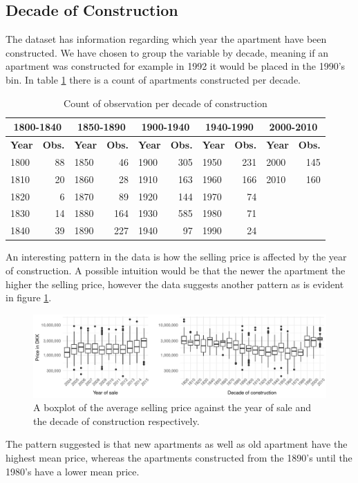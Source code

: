 \subsection*{Decade of Construction}
The dataset has information regarding which year the apartment have been constructed.
We have chosen to group the variable by decade, meaning if an apartment was constructed for example in 1992 it would be placed in the 1990's bin.
In table \ref{tbl:year_of_constuction} there is a count of apartments constructed per decade.
\begin{table}[H]
    \centering
    \begin{tabular}{lr|lr|lr|lr|lr}
        \toprule [1.5pt]
        \multicolumn{2}{c}{\textbf{1800-1840}} & 
        \multicolumn{2}{c}{\textbf{1850-1890}} & 
        \multicolumn{2}{c}{\textbf{1900-1940}} & 
        \multicolumn{2}{c}{\textbf{1940-1990}} & 
        \multicolumn{2}{c}{\textbf{2000-2010}} \\[2pt]
        \toprule[1.5pt]
        \textbf{Year} & \textbf{Obs.} & 
        \textbf{Year} & \textbf{Obs.} & 
        \textbf{Year} & \textbf{Obs.} & 
        \textbf{Year} & \textbf{Obs.} & 
        \textbf{Year} & \textbf{Obs.} \\
        \midrule
        1800 & 88 & 1850 & 46  & 1900 & 305 & 1950 & 231 & 2000 & 145 \\
        1810 & 20 & 1860 & 28  & 1910 & 163 & 1960 & 166 & 2010 & 160 \\
        1820 & 6  & 1870 & 89  & 1920 & 144 & 1970 & 74  \\
        1830 & 14 & 1880 & 164 & 1930 & 585 & 1980 & 71  \\
        1840 & 39 & 1890 & 227 & 1940 & 97  & 1990 & 24  \\
        \bottomrule
    \end{tabular}
    \caption{Count of observation per decade of construction}
    \label{tbl:year_of_constuction}
\end{table}
An interesting pattern in the data is how the selling price is affected by the year of construction.
A possible intuition would be that the newer the apartment the higher the selling price, however the data suggests another pattern as is evident in figure \ref{fig:house_price_year}.

\begin{figure}[H]
    \centering
    \includegraphics[width = \textwidth]{figures/Data_introduction/house_price_year.pdf}
    \caption{A boxplot of the average selling price against the year of sale and the decade of construction respectively.}
    \label{fig:house_price_year}
\end{figure}
The pattern suggested is that new apartments as well as old apartment have the highest mean price, whereas the apartments constructed from the 1890's until the 1980's have a lower mean price.

